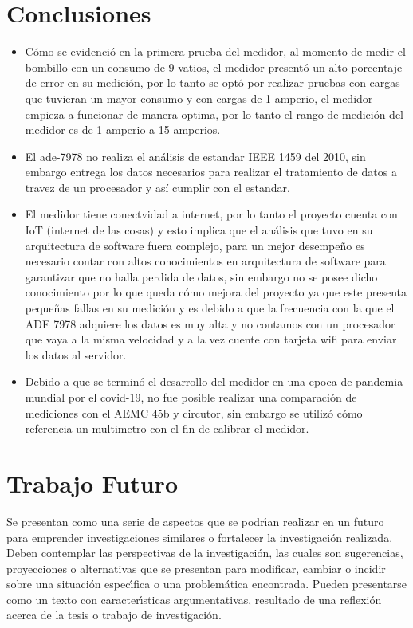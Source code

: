 {\clearpage}
\chapter{Conclusiones}

\begin{itemize}
    \itemsep0em
    \item Cómo se evidenció en la primera prueba del medidor, al momento de medir el bombillo con un consumo de 9 vatios, el medidor presentó un alto porcentaje de error en su medición, por lo tanto se optó por realizar pruebas con cargas que tuvieran un mayor consumo y con cargas de 1 amperio, el medidor empieza a funcionar de manera optima, por lo tanto el rango de medición del medidor es de 1 amperio a 15 amperios.
    \item El ade-7978 no realiza el análisis de estandar IEEE 1459 del 2010, sin embargo entrega los datos necesarios para realizar el tratamiento de datos a travez de un procesador y así cumplir con el estandar.
    \item El medidor tiene conectvidad a internet, por lo tanto el proyecto cuenta con IoT (internet de las cosas) y esto implica que el análisis que tuvo en su arquitectura de software fuera complejo, para un mejor desempeño es necesario contar con  altos conocimientos en arquitectura de software para garantizar que no halla perdida de datos, sin embargo no se posee dicho conocimiento por lo que queda cómo mejora del proyecto ya que este presenta pequeñas fallas en su medición y es debido a que la frecuencia con la que el ADE 7978 adquiere los datos es muy alta y no contamos con un procesador que vaya a la misma velocidad y a la vez cuente con tarjeta wifi para enviar los datos al servidor.
    \item Debido a que se terminó el desarrollo del medidor en una epoca de pandemia mundial por el covid-19, no fue posible realizar una comparación de mediciones con el AEMC 45b y circutor, sin embargo se utilizó cómo referencia un multimetro con el fin de calibrar el medidor.
\end{itemize}
\chapter{Trabajo Futuro}
Se presentan como una serie de aspectos que se podr\'{\i}an realizar en un futuro para emprender investigaciones similares o fortalecer la investigaci\'{o}n realizada. Deben contemplar las perspectivas de la investigaci\'{o}n, las cuales son sugerencias, proyecciones o alternativas que se presentan para modificar, cambiar o incidir sobre una situaci\'{o}n espec\'{\i}fica o una problem\'{a}tica encontrada. Pueden presentarse como un texto con caracter\'{\i}sticas argumentativas, resultado de una reflexi\'{o}n acerca de la tesis o trabajo de investigaci\'{o}n.\\